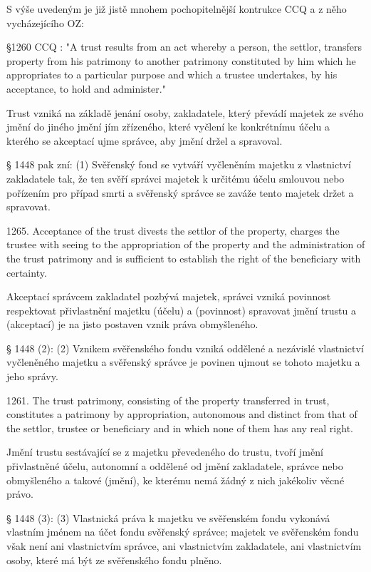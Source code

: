 \documentclass{article}
\begin{document}

S výše uvedeným je již jistě mnohem pochopitelnější kontrukce CCQ a z něho vycházejícího OZ:

§1260 CCQ : "A trust results from an act whereby a person, the settlor, transfers property from his patrimony to another patrimony constituted by him which he appropriates to a particular purpose and which a trustee undertakes, by his acceptance, to hold and administer."

Trust vzniká na základě jenání osoby, zakladatele, který převádí majetek ze svého jmění do jiného jmění jím zřízeného, které vyčlení ke konkrétnímu účelu a kterého se akceptací ujme správce, aby jmění držel a spravoval.

§ 1448 pak zní:
(1) Svěřenský fond se vytváří vyčleněním majetku z vlastnictví zakladatele tak, že ten svěří správci majetek k určitému účelu smlouvou nebo pořízením pro případ smrti a svěřenský správce se zaváže tento majetek držet a spravovat.

1265. Acceptance of the trust divests the settlor of the property, charges the trustee with seeing to the appropriation of the property and the administration of the trust patrimony and is sufficient to establish the right of the beneficiary with certainty.

Akceptací správcem zakladatel pozbývá majetek, správci vzniká povinnost respektovat přivlastnění majetku (účelu) a (povinnost) spravovat jmění trustu a (akceptací) je na jisto postaven vznik práva obmyšleného.

§ 1448 (2):
(2) Vznikem svěřenského fondu vzniká oddělené a nezávislé vlastnictví vyčleněného majetku a svěřenský správce je povinen ujmout se tohoto majetku a jeho správy.

1261. The trust patrimony, consisting of the property transferred in trust, constitutes a patrimony by appropriation, autonomous and distinct from that of the settlor, trustee or beneficiary and in which none of them has any real right.

Jmění trustu sestávající se z majetku převedeného do trustu, tvoří jmění přivlastněné účelu, autonomní a oddělené od jmění zakladatele, správce nebo obmyšleného a takové (jmění), ke kterému nemá žádný z nich jakékoliv věcné právo.

§ 1448 (3):
(3) Vlastnická práva k majetku ve svěřenském fondu vykonává vlastním jménem na účet fondu svěřenský správce; majetek ve svěřenském fondu však není ani vlastnictvím správce, ani vlastnictvím zakladatele, ani vlastnictvím osoby, které má být ze svěřenského fondu plněno. 
\end{document}
